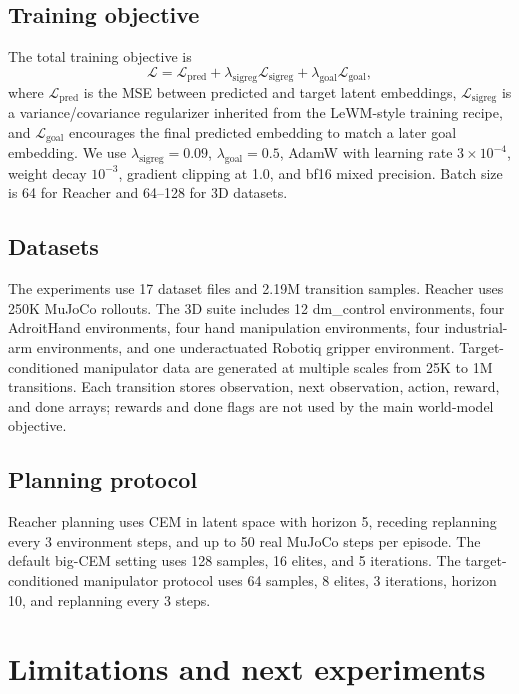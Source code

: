 \documentclass[10pt]{article}
\newcommand{\loss}{\mathcal{L}}
\begin{document}
\subsection{Training objective}

The total training objective is
\begin{equation}
    \loss = \loss_{\mathrm{pred}} + \lambda_{\mathrm{sigreg}}\loss_{\mathrm{sigreg}} + \lambda_{\mathrm{goal}}\loss_{\mathrm{goal}},
\end{equation}
where $\loss_{\mathrm{pred}}$ is the MSE between predicted and target latent embeddings, $\loss_{\mathrm{sigreg}}$ is a variance/covariance regularizer inherited from the LeWM-style training recipe, and $\loss_{\mathrm{goal}}$ encourages the final predicted embedding to match a later goal embedding. We use $\lambda_{\mathrm{sigreg}}=0.09$, $\lambda_{\mathrm{goal}}=0.5$, AdamW with learning rate $3\times10^{-4}$, weight decay $10^{-3}$, gradient clipping at 1.0, and bf16 mixed precision. Batch size is 64 for Reacher and 64--128 for 3D datasets.

\subsection{Datasets}

The experiments use 17 dataset files and 2.19M transition samples. Reacher uses 250K MuJoCo rollouts. The 3D suite includes 12 dm\_control environments, four AdroitHand environments, four hand manipulation environments, four industrial-arm environments, and one underactuated Robotiq gripper environment. Target-conditioned manipulator data are generated at multiple scales from 25K to 1M transitions. Each transition stores observation, next observation, action, reward, and done arrays; rewards and done flags are not used by the main world-model objective.

\subsection{Planning protocol}

Reacher planning uses CEM in latent space with horizon 5, receding replanning every 3 environment steps, and up to 50 real MuJoCo steps per episode. The default big-CEM setting uses 128 samples, 16 elites, and 5 iterations. The target-conditioned manipulator protocol uses 64 samples, 8 elites, 3 iterations, horizon 10, and replanning every 3 steps.

\section{Limitations and next experiments}
\end{document}
